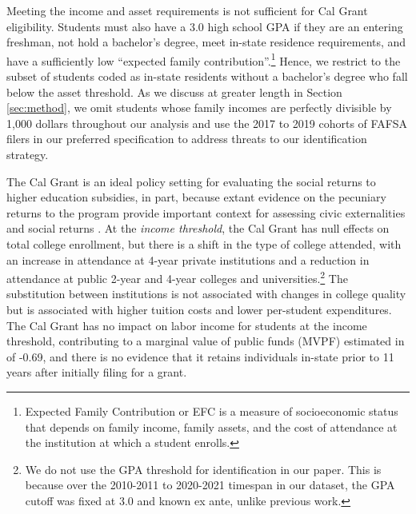 \documentclass[12pt,letterpaper,oneside]{book}
\begin{document}
 Meeting the income and asset requirements is not sufficient for Cal Grant eligibility. Students must also have a 3.0 high school GPA if they are an entering freshman, not hold a bachelor's degree, meet in-state residence requirements, and have a sufficiently low ``expected family contribution''.\footnote{Expected Family Contribution or EFC is a measure of socioeconomic status that depends on family income, family assets, and the cost of attendance at the institution at which a student enrolls.} Hence, we restrict to the subset of students coded as in-state residents without a bachelor's degree who fall below the asset threshold. As we discuss at greater length in Section \ref{sec:method}, we omit students whose family incomes are perfectly divisible by 1,000 dollars throughout our analysis and use the 2017 to 2019 cohorts of FAFSA filers in our preferred specification to address threats to our identification strategy.

The Cal Grant is an ideal policy setting for evaluating the social returns to higher education subsidies, in part, because extant evidence on the pecuniary returns to the program provide important context for assessing civic externalities and social returns \citep{kane_quasi-experimental_2003,bettinger_long-run_2019,hendren_unified_2020}. At the \textit{income threshold}, the Cal Grant has null effects on total college enrollment, but there is a shift in the type of college attended, with an increase in attendance at 4-year private institutions and a reduction in attendance at public 2-year and 4-year colleges and universities.\footnote{We do not use the GPA threshold for identification in our paper. This is because over the 2010-2011 to 2020-2021 timespan in our dataset, the GPA cutoff was fixed at 3.0 and known ex ante, unlike previous work.} The substitution between institutions is not associated with changes in college quality but is associated with higher tuition costs and lower per-student expenditures. The Cal Grant has no impact on labor income for students at the income threshold, contributing to a marginal value of public funds (MVPF) estimated in \cite{hendren_unified_2020} of -0.69, and there is no evidence that it retains individuals in-state prior to 11 years after initially filing for a grant.
\end{document}
